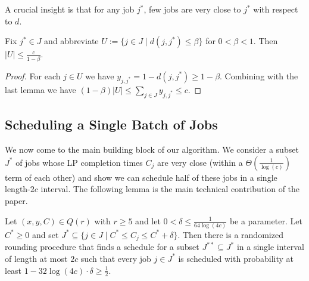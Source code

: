 A crucial insight is that for any job $j^*$, few jobs are very close to $j^*$ with respect to $d$.

\begin{lemma} \label{lem:SmallNeighborhoodOfClosePoints}
Fix $j^* \in J$ and abbreviate $U := \{ j \in J \mid d(j,j^*) \leq \beta\}$ for $0<\beta<1$. Then $|U| \leq \frac{c}{1-\beta}$. 
\end{lemma}
\begin{proof}
  For each $j \in U$ we have $y_{j,j^*} = 1 - d(j,j^*) \geq 1-\beta$. Combining with the last
  lemma we have $(1-\beta)|U|\leq\sum_{j \in J} y_{j,j^*} \leq c$.
\end{proof}






\subsection{Scheduling a Single Batch of Jobs}
\label{subsec:singlebatch}

We now come to the  main building block of our algorithm. We consider a subset $J^*$ of
jobs whose LP completion times $C_j$ are very close (within a $\Theta(\frac{1}{\log(c)})$ term of each other)
and show we can schedule half of these jobs in a single length-$2c$ interval. 
The following lemma is the main technical contribution of the paper.

\begin{lemma} \label{lem:SchedulingOneIntervalViaCKR}
  Let $(x,y,C) \in Q(r)$ with $r \geq 5$ and let $0<\delta \leq \frac{1}{64\log(4c)}$ be a parameter. Let $C^* \geq 0$ and set
   $J^* \subseteq \{ j \in J \mid C^* \leq C_j \leq C^*+\delta\}$.
  Then there is a randomized rounding procedure that finds a schedule for a subset $J^{**} \subseteq J^*$ in a single interval of length at most $2c$  such that every job $j \in J^*$
  is scheduled with probability at least $1 - 32 \log(4 c) \cdot \delta \geq\frac{1}{2}$.
\end{lemma}

